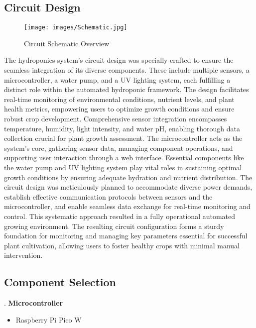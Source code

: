 \documentclass[12pt]{article}
\begin{document}
\subsection{Circuit Design}
\noindent

\begin{figure}[H]
    \centering
    \texttt{[image: images/Schematic.jpg]}
    \caption{Circuit Schematic Overview}
    \label{fig:Schematic_Full}
\end{figure}

\noindent The hydroponics system's circuit design was specially crafted to ensure the seamless integration of its diverse components. These include multiple sensors, a microcontroller, a water pump, and a UV lighting system, each fulfilling a distinct role within the automated hydroponic framework. The design facilitates real-time monitoring of environmental conditions, nutrient levels, and plant health metrics, empowering users to optimize growth conditions and ensure robust crop development.
\newline
\newline
\noindent Comprehensive sensor integration encompasses temperature, humidity, light intensity, and water pH, enabling thorough data collection crucial for plant growth assessment. The microcontroller acts as the system's core, gathering sensor data, managing component operations, and supporting user interaction through a web interface. Essential components like the water pump and UV lighting system play vital roles in sustaining optimal growth conditions by ensuring adequate hydration and nutrient distribution.
\newline
\newline
\noindent The circuit design was meticulously planned to accommodate diverse power demands, establish effective communication protocols between sensors and the microcontroller, and enable seamless data exchange for real-time monitoring and control. This systematic approach resulted in a fully operational automated growing environment. The resulting circuit configuration forms a sturdy foundation for monitoring and managing key parameters essential for successful plant cultivation, allowing users to foster healthy crops with minimal manual intervention.
\newline

\subsection{Component Selection}
. \textbf{Microcontroller}
\begin{itemize}
    \item Raspberry Pi Pico W
\end{itemize}
\end{document}
